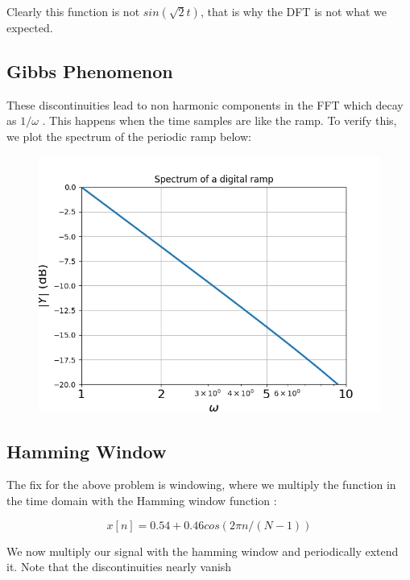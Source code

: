 \documentclass[11pt, a4paper]{article}
\begin{document}
Clearly this function is not $sin(\sqrt{2}t)$, that is why the DFT is not what we expected.

\subsection*{Gibbs Phenomenon}
These discontinuities lead to non harmonic components in the FFT which decay as $1/\omega$ . This happens when the time samples are like the ramp. To verify this, we plot the spectrum of the periodic ramp below:

\begin{figure}[!tbh]
\centering
\includegraphics[scale=0.5]{assgn10_plot4.png} 
\label{fig4}
\end{figure} 

\subsection*{Hamming Window}
The fix for the above problem is windowing, where we multiply the function in the time domain with the Hamming window function :

\begin{equation*}
x[n] = 0.54 + 0.46cos(2\pi n/(N-1))
\end{equation*}

We now multiply our signal with the hamming window and periodically extend it. Note that the discontinuities nearly vanish
\end{document}
